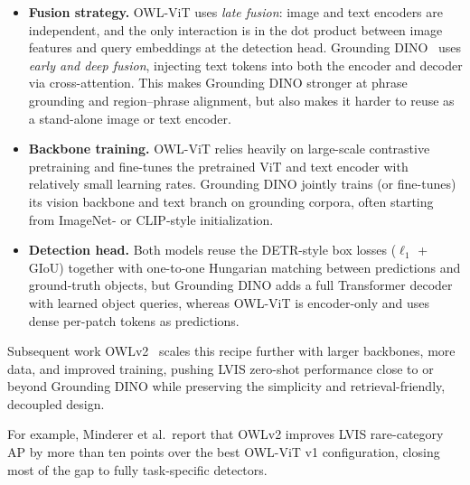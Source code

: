 \begin{enrichment}
\begin{enrichment}
		\begin{itemize}
			\item \textbf{Fusion strategy.}
			OWL-ViT uses \emph{late fusion}: image and text encoders are independent, and the only interaction is in the dot product between image features and query embeddings at the detection head.
			Grounding DINO~\cite{liu2023_groundingdino} uses \emph{early and deep fusion}, injecting text tokens into both the encoder and decoder via cross-attention.
			This makes Grounding DINO stronger at phrase grounding and region–phrase alignment, but also makes it harder to reuse as a stand-alone image or text encoder.
			\item \textbf{Backbone training.}
			OWL-ViT relies heavily on large-scale contrastive pretraining and fine-tunes the pretrained ViT and text encoder with relatively small learning rates.
			Grounding DINO jointly trains (or fine-tunes) its vision backbone and text branch on grounding corpora, often starting from ImageNet- or CLIP-style initialization.
			\item \textbf{Detection head.}
			Both models reuse the DETR-style box losses ($\ell_1$ + GIoU) together with one-to-one Hungarian matching between predictions and ground-truth objects, but Grounding DINO adds a full Transformer decoder with learned object queries, whereas OWL-ViT is encoder-only and uses dense per-patch tokens as predictions.
		\end{itemize}
		
		Subsequent work OWLv2~\cite{minderer2024_owlvitv2} scales this recipe further with larger backbones, more data, and improved training, pushing LVIS zero-shot performance close to or beyond Grounding DINO while preserving the simplicity and retrieval-friendly, decoupled design.
		
		\newpage
		
		For example, Minderer et al.\ report that OWLv2 improves LVIS rare-category AP by more than ten points over the best OWL-ViT v1 configuration, closing most of the gap to fully task-specific detectors.
	\end{enrichment}
	

\end{enrichment}
